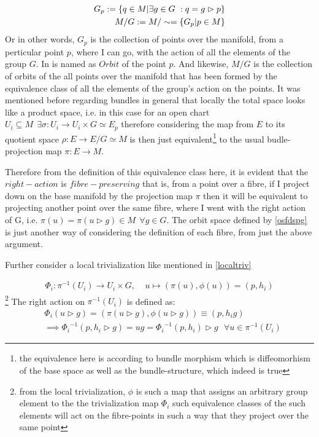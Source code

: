 \documentclass[8pt, twocoloumn]{article}
\begin{document}
\begin{align}
\begin{split} {\label{osfdspg}}
G_p : = \{	q \in M	| \exists g\in G \ : q = g \vartriangleright  p \}
\end{split}\\
M/G := M/ \sim = \{G_p | p\in M \}
\end{align}
Or in other words, $G_p$ is the collection of points over the manifold, from a perticular point $p$, where I can go, with the action of all the elements of the group $G$. In is named as $Orbit$ of the point $p$. And likewise, $M/G$ is the collection of orbits of the all points over the manifold that has been formed by the equivalence class of all the elements of the group's action on the points. It was mentioned before regarding bundles in general that locally the total space looks like a product space, i.e. in this case for an open chart $U_i \subseteq M  \  \ \exists \sigma: U_i \to U_i \times G \simeq E_p$ therefore considering the map from $E$ to its quotient space $\rho: E \to E/G \simeq M$  is then just equivalent\footnote{the equivalence here is according to bundle morphism which is diffeomorhism of the base space as well as the bundle-structure, which indeed is  true} to the usual budle-projection map $\pi: E \to M$. 

Therefore from the definition of this equivalence class here, it is evident that the $right-action$ is $fibre-preserving$ that is, from a point over a fibre, if I project down on the base manifold by the projection map $\pi$ then it will be equivalent to projecting another point over the same fibre, where I went with the right action of G, i.e. $\pi(u)=\pi(u \vartriangleright g) \in M \  \ \forall g \in G$. The orbit space defined by \ref{osfdspg} is just another way of considering the definition of each fibre, from just the above argument. 

Further consider a local trivialization like mentioned in \ref{localtriv}

\begin{align}
\Phi_i: \pi^{-1}(U_i) \to U_i \times G,  \ \ \ \ \ u \mapsto (\pi(u), \phi(u)) = (p, h_i)
\end{align}
\footnote{from the local trivialization, $\phi$ is such a map that assigns an arbitrary group element to the the trivialization map $\Phi_i$ such equivalence classes of the such elements will act on the fibre-points in such a way that they project over the same point} The right action on $\pi^{-1}(U_i)$ is defined as:
\begin{align}
& \Phi_i(u \vartriangleright  g) = (\pi(u  \vartriangleright g), \phi(u  \vartriangleright g)) \equiv (p, h_i g) \\
& \implies {\Phi_i}^{-1}(p, h_i  \vartriangleright g) = ug = {\Phi_i}^{-1}(p, h_i)  \vartriangleright g \ \ \ \forall u \in \pi^{-1}(U_i)
\end{align}
\end{document}
